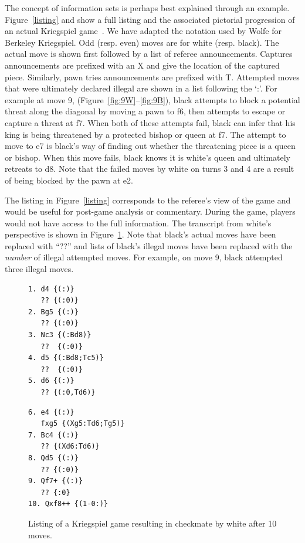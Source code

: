 \documentclass[times, 10pt,twocolumn]{article}
\begin{document}
The concept of information sets is perhaps best explained through an example. 
Figure~\ref{listing} and show a full listing and the associated pictorial progression of an actual
Kriegspiel game~\cite{li94chess}.  We have adapted the notation used by Wolfe for Berkeley Kriegspiel.  Odd (resp. even) moves are for white (resp. black).  The actual move is shown
first followed by a list of referee announcements.  Captures announcements are prefixed with an X and give the location
of the captured piece.  Similarly, pawn tries announcements are prefixed with T.  Attempted moves that were ultimately
declared illegal are shown in a list following the `:'.  For example at move 9, (Figure~\ref{fig:9W}--\ref{fig:9B}),
black attempts to block a potential threat along the diagonal by moving a pawn to f6, then attempts to escape or capture
a threat at f7.  When both of these attempts fail, black can infer that his king is being threatened by a protected
bishop or queen at f7.  The attempt to move to e7 is black's way of finding out whether the threatening piece is a queen
or bishop.  When this move fails, black knows it is white's queen and ultimately retreats to d8.  Note that the failed
moves by white on turns 3 and 4 are a result of being blocked by the pawn at e2.


The listing in Figure~\ref{listing} corresponds to the referee's view of the game and would be useful for
post-game analysis or commentary.  During the game, players would not have access to the full information.  The
transcript from white's perspective is shown in Figure~\ref{filteredlisting}.  Note that black's actual moves have been
replaced with ``??'' and lists of black's illegal moves have been replaced with the {\em number} of illegal attempted
moves.  For example, on move 9, black attempted three illegal moves.
\begin{figure}
\begin{minipage}[b]{0.35\linewidth}
\centering
\small
\begin{verbatim}
1. d4 {(:)}
   ?? {(:0)}
2. Bg5 {(:)}
   ?? {(:0)}
3. Nc3 {(:Bd8)}
   ??  {(:0)}
4. d5 {(:Bd8;Tc5)}
   ??  {(:0)}
5. d6 {(:)}
   ?? {(:0,Td6)}
\end{verbatim}
\end{minipage}
\begin{minipage}[b]{0.25\linewidth}
\small
\centering
\begin{verbatim}
6. e4 {(:)}
   fxg5 {(Xg5:Td6;Tg5)}
7. Bc4 {(:)}
   ?? {(Xd6:Td6)}
8. Qd5 {(:)}
   ?? {(:0)}
9. Qf7+ {(:)} 
   ?? {:0}
10. Qxf8++ {(1-0:)}
\end{verbatim}
\end{minipage}
\vspace{-0.1in}
\caption{Listing of a Kriegspiel game resulting in checkmate by white after 10 moves.}
\label{filteredlisting}
\vspace{-0.2in}
\end{figure}
\end{document}
